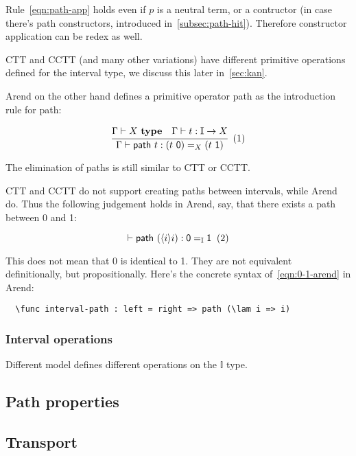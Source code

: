 Rule~\ref{eqn:path-app} holds even if $p$ is a neutral term,
or a contructor (in case there's path constructors,
introduced in~\cref{subsec:path-hit}).
Therefore constructor application can be redex as well.

CTT and CCTT (and many other variations) have different primitive
operations defined for the interval type,
we discuss this later in~\cref{sec:kan}.

Arend on the other hand defines a primitive operator \textsf{path}
as the introduction rule for path:

\[
  \cfrac{
    \Gamma \vdash X \ \textbf{type}
    \quad
    \Gamma \vdash t : \mathbb I \rightarrow X
  }{
    \Gamma \vdash \textsf{path} \ t : (t \ \textsf 0) =_X (t \ \textsf 1)
  }
  \xtag
\]

The elimination of paths is still similar to CTT or CCTT.

CTT and CCTT do not support creating paths between intervals,
while Arend do.
Thus the following judgement holds in Arend, say,
that there exists a path between \textsf 0 and \textsf 1:

\[
  \vdash \textsf{path}\ (\lrangle i i) : \textsf 0 =_{\mathbb I} \textsf 1
  \xtag \label{eqn:0-1-arend}
\]

This does not mean that \textsf 0 is identical to \textsf 1.
They are not equivalent definitionally, but propositionally.
Here's the concrete syntax of~\ref{eqn:0-1-arend} in Arend:

\begin{verbatim}
  \func interval-path : left = right => path (\lam i => i)
\end{verbatim}

\subsubsection{Interval operations}

Different model defines different operations on the $\mathbb I$ type.

\TODO

\subsection{Path properties}
\label{subsec:path-prop}


\subsection{Transport}
\label{subsec:coe}


